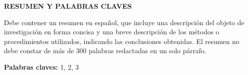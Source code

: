 \begin{center}
	{\titulodc \textbf{RESUMEN Y PALABRAS CLAVES}}
\end{center}

Debe contener un resumen en español, que incluye una descripción del objeto de
investigación en forma concisa y una breve descripción de los métodos o procedimientos utilizados, indicando las conclusiones obtenidas. El resumen no debe constar de más de 300 palabras redactadas en un solo párrafo. 

\textbf{Palabras claves:} 1, 2, 3
